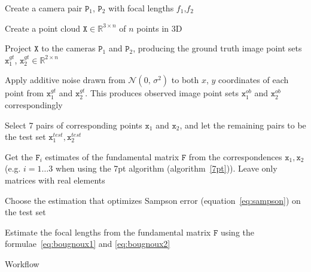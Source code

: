 \begin{algorithm}[H]
\SetAlgoNoLine
\LinesNumbered
 \Begin
    {Create a camera pair $\mathtt{P}_1$, $\mathtt{P}_2$ with focal lengths $f_1$,$f_2$\; 
 
    Create a point cloud $\mathtt{X} \in \mathbb{R}^{3 \times n}$ of $n$ points in 3D \;
    
    Project $\mathtt{X}$ to the cameras $\mathtt{P}_1$ and $\mathtt{P}_2$, producing the ground truth image point sets ${\mathtt{x}}_1^{gt}$, ${\mathtt{x}}_2^{gt} \in \mathbb{R}^{2 \times n}$ \;
    
    
    Apply additive noise drawn from $\mathcal{N}(0,\,\sigma^{2})$ to both $x$, $y$ coordinates of each point from ${\mathtt{x}}_1^{gt}$ and ${\mathtt{x}}_2^{gt}$. This produces observed image point sets $\mathtt{x}_1^{ob}$ and $\mathtt{x}_2^{ob}$ correspondingly \;
    
    Select 7 pairs of corresponding points $\mathtt{x}_1$ and $\mathtt{x}_2$, and let the remaining pairs to be the test set $\mathtt{x}_1^{test}, \mathtt{x}_2^{test}$ \;
    
    Get the $\mathtt{F}_i$ estimates of the fundamental matrix $\mathtt{F}$ from the correspondences $\mathtt{x}_1,\mathtt{x}_2$  (e.g. $i = 1\dots 3$ when using the 7pt algorithm (algorithm~\ref{7pt})). Leave only matrices with real elements\;
    
    Choose the estimation that optimizes Sampson error (equation~\ref{eq:sampson}) on the test set\;
    
    Estimate the focal lengths from the fundamental matrix $\mathtt{F}$ using the formulae~\ref{eq:bougnoux1} and \ref{eq:bougnoux2}\;
    }
 \caption{Workflow}
 \label{workflow}
\end{algorithm}


